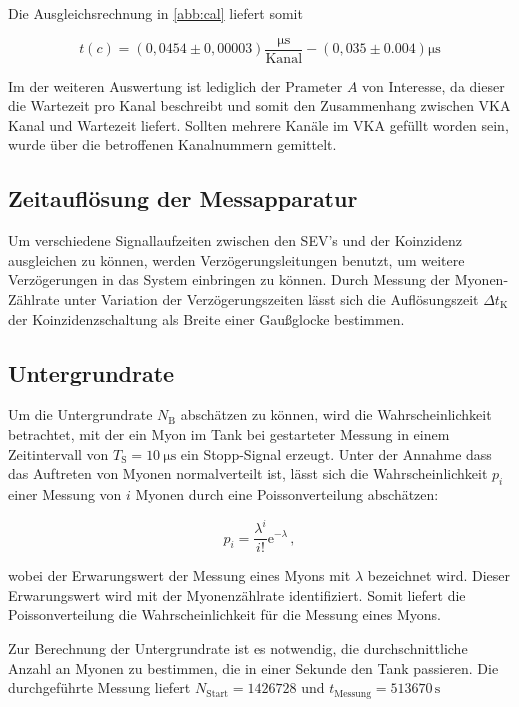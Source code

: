 \noindent Die Ausgleichsrechnung in \ref{abb:cal} liefert somit

\begin{equation}
	t(c) = (0,0454 \pm 0,00003)\frac{\si{\micro\second}}{\text{Kanal}} - (0,035 \pm 0.004) \si{\micro\second}
\end{equation}

\noindent Im der weiteren Auswertung ist lediglich der Prameter $A$ von Interesse, da dieser die Wartezeit pro Kanal beschreibt und somit den Zusammenhang zwischen VKA Kanal und Wartezeit liefert. Sollten mehrere 
Kanäle im VKA gefüllt worden sein, wurde über die betroffenen Kanalnummern gemittelt.

\subsection{Zeitauflösung der Messapparatur}
\label{subsec:timeresolution}
Um verschiedene Signallaufzeiten zwischen den SEV's und der Koinzidenz ausgleichen zu können, werden Verzögerungsleitungen benutzt, um weitere Verzögerungen in das System einbringen zu können. Durch Messung der Myonen-Zählrate unter Variation der Verzögerungszeiten lässt sich die Auflösungszeit $\Delta t_\text{K}$ der Koinzidenzschaltung als Breite einer Gaußglocke bestimmen.


\subsection{Untergrundrate}
\label{subsec:underground}

Um die Untergrundrate $N_\text{B}$ abschätzen zu können, wird die Wahrscheinlichkeit betrachtet, mit der ein Myon im Tank bei gestarteter Messung in einem Zeitintervall von $T_\text{S} = \SI{10}{\micro \second}$ ein Stopp-Signal erzeugt. Unter der Annahme dass das Auftreten von Myonen normalverteilt ist, lässt sich die Wahrscheinlichkeit $p_i$ einer Messung von $i$ Myonen durch eine Poissonverteilung abschätzen:

\begin{equation}
p_i = \frac{\lambda^i}{i!}\mathrm{e}^{-\lambda}\,,
\end{equation}

\noindent wobei der Erwarungswert der Messung eines Myons mit $\lambda$ bezeichnet wird. Dieser Erwarungswert wird mit der Myonenzählrate identifiziert. Somit liefert die Poissonverteilung die Wahrscheinlichkeit
für die Messung eines Myons.

\noindent Zur Berechnung der Untergrundrate ist es notwendig, die durchschnittliche Anzahl an Myonen zu bestimmen, die in einer Sekunde den Tank passieren.
Die durchgeführte Messung liefert $N_{\text{Start}} = 1426728$ und $t_{\text{Messung}} = 513670 \, \si{\second}$

